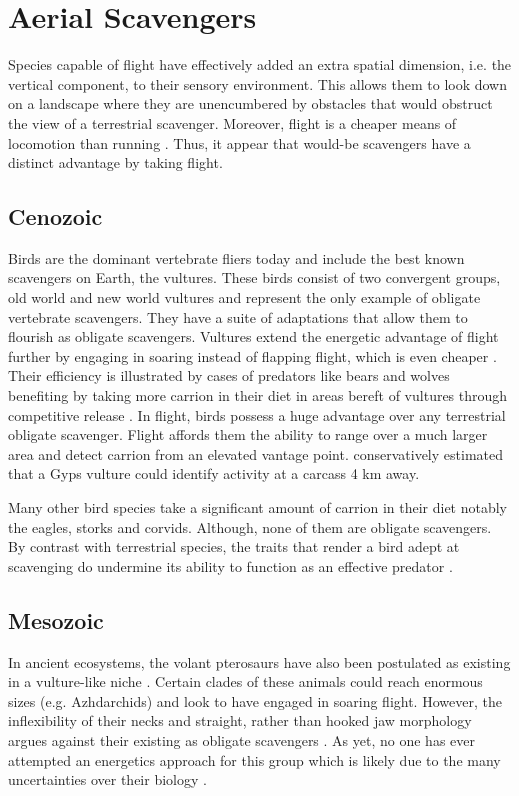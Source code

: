 \documentclass[a4paper,12pt]{article}
\begin{document}
\section{Aerial Scavengers}
Species capable of flight have effectively added an extra spatial dimension, i.e. the vertical component, to their sensory environment.
This allows them to look down on a landscape where they are unencumbered by obstacles that would obstruct the view of a terrestrial scavenger.
Moreover, flight is a cheaper means of locomotion than running \citep{tucker1975energetic}. 
Thus, it appear that would-be scavengers have a distinct advantage by taking flight. 

\subsection*{Cenozoic}
Birds are the dominant vertebrate fliers today and include the best known scavengers on Earth, the vultures. 
These birds consist of two convergent groups, old world and new world vultures and represent the only example of obligate vertebrate scavengers. 
They have a suite of adaptations that allow them to flourish as obligate scavengers.
Vultures extend the energetic advantage of flight further by engaging in soaring instead of flapping flight, which is even cheaper \citep{hedenstrom1993migration}.
Their efficiency is illustrated by cases of predators like bears and wolves benefiting by taking more carrion in their diet in areas bereft of vultures through competitive release \citep{devault2003scavenging}. 
In flight, birds possess a huge advantage over any terrestrial obligate scavenger. 
Flight affords them the ability to range over a much larger area and detect carrion from an elevated vantage point.
\cite{pennycuick1972soaring} conservatively estimated that a Gyps vulture could identify activity at a carcass 4 km away. 

Many other bird species take a significant amount of carrion in their diet notably the eagles, storks and corvids. 
Although, none of them are obligate scavengers. 
By contrast with terrestrial species, the traits that render a bird adept at scavenging do undermine its ability to function as an effective predator \citep{devault2003scavenging}. 

\subsection*{Mesozoic}
In ancient ecosystems, the volant pterosaurs have also been postulated as existing in a vulture-like niche \citep{witton2008reappraisal}. 
Certain clades of these animals could reach enormous sizes (e.g. Azhdarchids) and look to have engaged in soaring flight. 
However, the inflexibility of their necks and straight, rather than hooked jaw morphology argues against their existing as obligate scavengers \citep{witton2008reappraisal}. 
As yet, no one has ever attempted an energetics approach for this group which is likely due to the many uncertainties over their biology \citep{witton2010size}. 
\end{document}
